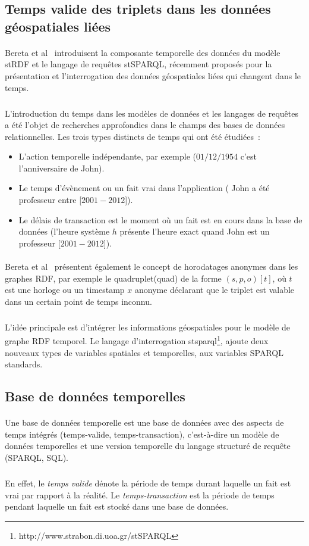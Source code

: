 \documentclass[12pt,a4]{report}
\begin{document}
\subsection{Temps valide des triplets dans les données géospatiales liées}
\paragraph{}
Bereta et al~\cite{bereta2013} introduisent la composante temporelle des données du modèle stRDF et le langage de requêtes stSPARQL, récemment proposés pour la présentation et l’interrogation des données géospatiales liées qui changent dans le temps.
\subparagraph{}
L’introduction du temps dans les modèles de données et les langages de requêtes a été l’objet de recherches approfondies dans le champs des bases de données relationnelles.
\newline
Les trois types distincts de temps qui ont été étudiées~:
\begin{itemize}
\item L'action temporelle indépendante, par exemple ($01/12/1954$ c’est l’anniversaire de John).
\item Le temps d’évènement ou un fait vrai dans l’application ( John a été professeur entre [$2001-2012$]).
\item Le délais de transaction est le moment où un fait est en cours dans la base de données (l’heure système $h$ présente l’heure exact quand John est un professeur [$2001-2012$]).
\end{itemize}
\paragraph{}
Bereta et al~\cite{bereta2013} présentent également le concept de horodatages anonymes dans les graphes RDF, par exemple le quadruplet(quad) de la forme $(s, p, o)[t]$, où $t$ est une horloge ou un timestamp $x$ anonyme déclarant que le triplet est valable dans un certain point de temps inconnu.
\subparagraph{}
L’idée principale est d’intégrer les informations géospatiales pour le modèle de graphe RDF temporel. Le langage d’interrogation \gls{stsparql}\footnote{http://www.strabon.di.uoa.gr/stSPARQL}, ajoute deux nouveaux types de variables spatiales et temporelles, aux variables SPARQL standards.
\subsection{Base de données temporelles}
\paragraph{}
Une base de données temporelle est une base de données avec des aspects de temps intégrés (temps-valide, temps-transaction), c'est-à-dire un modèle de données temporelles et une version temporelle du langage structuré de requête (SPARQL, SQL).
\subparagraph{}
En effet, le \textit{temps valide} dénote la période de temps durant laquelle un fait est vrai par rapport à la réalité.
Le \textit{temps-transaction} est la période de temps pendant laquelle un fait est stocké dans une base de données.
\end{document}
